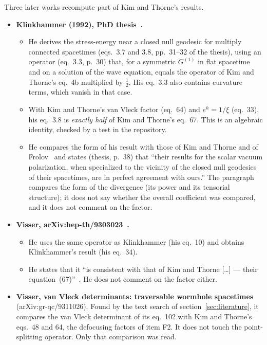 Three later works recompute part of Kim and Thorne's results.
\begin{itemize}
\item \textbf{Klinkhammer (1992), PhD thesis~\cite{klinkhammer1992}.}
  \begin{itemize}
  \item He derives the stress-energy near a closed null geodesic for multiply connected spacetimes (eqs.~3.7 and 3.8, pp.~31--32 of the thesis), using an operator (eq.~3.3, p.~30) that, for a symmetric $G^{(1)}$ in flat spacetime and on a solution of the wave equation, equals the operator of Kim and Thorne's eq.~4b multiplied by $\tfrac12$. His eq.~3.3 also contains curvature terms, which vanish in that case.
  \item With Kim and Thorne's van Vleck factor (eq.~64) and $e^h = 1/\xi$ (eq.~33), his eq.~3.8 is \emph{exactly half} of Kim and Thorne's eq.~67. This is an algebraic identity, checked by a test in the repository.
  \item He compares the form of his result with those of Kim and Thorne and of Frolov~\cite{frolov1991} and states (thesis, p.~38) that ``their results for the scalar vacuum polarization, when specialized to the vicinity of the closed null geodesics of their spacetimes, are in perfect agreement with ours.'' The paragraph compares the form of the divergence (its power and its tensorial structure); it does not say whether the overall coefficient was compared, and it does not comment on the factor.
  \end{itemize}
\item \textbf{Visser, arXiv:hep-th/9303023~\cite{visser1993}.}
  \begin{itemize}
  \item He uses the same operator as Klinkhammer (his eq.~10) and obtains Klinkhammer's result (his eq.~34).
  \item He states that it ``is consistent with that of Kim and Thorne [\ldots] --- their equation~(67)''~\cite{kim1991}. He does not comment on the factor either.
  \end{itemize}
\end{itemize}
\begin{itemize}
\item \textbf{Visser, van Vleck determinants: traversable wormhole spacetimes~\cite{visser1994}} (arXiv:gr-qc/9311026). Found by the text search of section~\ref{sec:literature}, it compares the van Vleck determinant of its eq.~102 with Kim and Thorne's eqs.~48 and 64, the defocusing factors of item F2. It does not touch the point-splitting operator. Only that comparison was read.
\end{itemize}

